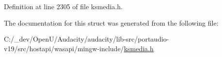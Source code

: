 Definition at line 2305 of file ksmedia.\+h.



The documentation for this struct was generated from the following file\+:\begin{DoxyCompactItemize}
\item 
C\+:/\+\_\+dev/\+Open\+U/\+Audacity/audacity/lib-\/src/portaudio-\/v19/src/hostapi/wasapi/mingw-\/include/\hyperlink{ksmedia_8h}{ksmedia.\+h}\end{DoxyCompactItemize}
